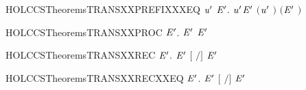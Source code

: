 \newcommand{\HOLCCSTheoremsTRANSXXPREFIX}{\UseVerbatim{HOLCCSTheoremsTRANSXXPREFIX}}
\begin{SaveVerbatim}{HOLCCSTheoremsTRANSXXPREFIXXXEQ}
\HOLTokenTurnstile{} \HOLSymConst{\HOLTokenForall{}}  \ensuremath{\HOLBoundVar{u}\sp{\prime{}}} \ensuremath{\HOLBoundVar{E}\sp{\prime{}}}. \HOLSymConst{\ensuremath{\ldotp}} \HOLTokenTransBegin\ensuremath{\HOLBoundVar{u}\sp{\prime{}}}\HOLTokenTransEnd \ensuremath{\HOLBoundVar{E}\sp{\prime{}}} \HOLSymConst{\HOLTokenEquiv{}} \ensuremath{(}\ensuremath{\HOLBoundVar{u}\sp{\prime{}}} \HOLSymConst{\ensuremath{=}} \ensuremath{)} \HOLSymConst{\HOLTokenConj{}} \ensuremath{(}\ensuremath{\HOLBoundVar{E}\sp{\prime{}}} \HOLSymConst{\ensuremath{=}} \ensuremath{)}
\end{SaveVerbatim}
\newcommand{\HOLCCSTheoremsTRANSXXPREFIXXXEQ}{\UseVerbatim{HOLCCSTheoremsTRANSXXPREFIXXXEQ}}
\begin{SaveVerbatim}{HOLCCSTheoremsTRANSXXPROC}
\HOLTokenTurnstile{} \HOLSymConst{\HOLTokenForall{}}  \ensuremath{\HOLBoundVar{E}\sp{\prime{}}}.  \HOLTokenTransBegin{}\HOLTokenTransEnd \ensuremath{\HOLBoundVar{E}\sp{\prime{}}} \HOLSymConst{\HOLTokenConj{}}   \HOLSymConst{\HOLTokenImp{}}  \ensuremath{\HOLBoundVar{E}\sp{\prime{}}}
\end{SaveVerbatim}
\newcommand{\HOLCCSTheoremsTRANSXXPROC}{\UseVerbatim{HOLCCSTheoremsTRANSXXPROC}}
\begin{SaveVerbatim}{HOLCCSTheoremsTRANSXXREC}
\HOLTokenTurnstile{} \HOLSymConst{\HOLTokenForall{}}   \ensuremath{\HOLBoundVar{E}\sp{\prime{}}}.    \HOLTokenTransBegin{}\HOLTokenTransEnd \ensuremath{\HOLBoundVar{E}\sp{\prime{}}} \HOLSymConst{\HOLTokenImp{}} \ensuremath{[}  \ensuremath{/}\ensuremath{]}  \HOLTokenTransBegin{}\HOLTokenTransEnd \ensuremath{\HOLBoundVar{E}\sp{\prime{}}}
\end{SaveVerbatim}
\newcommand{\HOLCCSTheoremsTRANSXXREC}{\UseVerbatim{HOLCCSTheoremsTRANSXXREC}}
\begin{SaveVerbatim}{HOLCCSTheoremsTRANSXXRECXXEQ}
\HOLTokenTurnstile{} \HOLSymConst{\HOLTokenForall{}}   \ensuremath{\HOLBoundVar{E}\sp{\prime{}}}.    \HOLTokenTransBegin{}\HOLTokenTransEnd \ensuremath{\HOLBoundVar{E}\sp{\prime{}}} \HOLSymConst{\HOLTokenEquiv{}} \ensuremath{[}  \ensuremath{/}\ensuremath{]}  \HOLTokenTransBegin{}\HOLTokenTransEnd \ensuremath{\HOLBoundVar{E}\sp{\prime{}}}
\end{SaveVerbatim}
